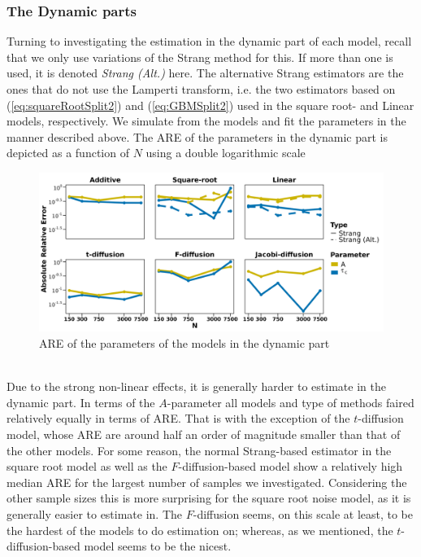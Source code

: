 \subsubsection{The Dynamic parts}
Turning to investigating the estimation in the dynamic part of each model, recall that we only use variations of the Strang method for this. If more than one is used, it is denoted \textit{Strang (Alt.)} here. The alternative Strang estimators are the ones that do not use the Lamperti transform, i.e. the two estimators based on (\ref{eq:squareRootSplit2}) and (\ref{eq:GBMSplit2}) used in the square root- and Linear models, respectively. We simulate from the models and fit the parameters in the manner described above. The ARE of the parameters in the dynamic part is depicted as a function of $N$ using a double logarithmic scale 
\begin{figure}[h!]
    \begin{center}
    \includegraphics[scale = .1]{figures/parameter_precision_dynamic.jpeg}
    \caption{ARE of the parameters of the models in the dynamic part}
    \label{figure:parameter_precision_dynamic}        
\end{center}
\end{figure}\\
Due to the strong non-linear effects, it is generally harder to estimate in the dynamic part. In terms of the $A$-parameter all models and type of methods faired relatively equally in terms of ARE. That is with the exception of the $t$-diffusion model, whose ARE are around half an order of magnitude smaller than that of the other models. For some reason, the normal Strang-based estimator in the square root model as well as the $F$-diffusion-based model show a relatively high median ARE for the largest number of samples we investigated.  Considering the other sample sizes this is more surprising for the square root noise model, as it is generally easier to estimate in. The $F$-diffusion seems, on this scale at least, to be the hardest of the models to do estimation on; whereas, as we mentioned, the $t$-diffusion-based model seems to be the nicest. 


